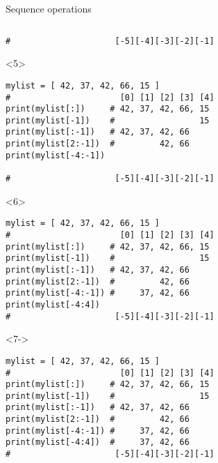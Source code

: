 \begin{frame}[fragile]{Sequence operations}
\begin{center}
\begin{columns}[onlytextwidth]
\begin{column}{\textwidth}
\begin{onlyenv}
\begin{lstlisting}[style=python,morekeywords={for, in, range, list}]
#                     [-5][-4][-3][-2][-1] \end{lstlisting}
      \end{onlyenv}

      \begin{onlyenv}<5>
        \begin{lstlisting}[style=python,morekeywords={for, in, range, list}]
mylist = [ 42, 37, 42, 66, 15 ]
#                      [0] [1] [2] [3] [4]
print(mylist[:])     # 42, 37, 42, 66, 15
print(mylist[-1])    #                 15
print(mylist[:-1])   # 42, 37, 42, 66
print(mylist[2:-1])  #         42, 66
print(mylist[-4:-1])

#                     [-5][-4][-3][-2][-1] \end{lstlisting}
      \end{onlyenv}

      \begin{onlyenv}<6>
        \begin{lstlisting}[style=python,morekeywords={for, in, range, list}]
mylist = [ 42, 37, 42, 66, 15 ]
#                      [0] [1] [2] [3] [4]
print(mylist[:])     # 42, 37, 42, 66, 15
print(mylist[-1])    #                 15
print(mylist[:-1])   # 42, 37, 42, 66
print(mylist[2:-1])  #         42, 66
print(mylist[-4:-1]) #     37, 42, 66
print(mylist[-4:4])
#                     [-5][-4][-3][-2][-1] \end{lstlisting}
      \end{onlyenv}

      \begin{onlyenv}<7->
        \begin{lstlisting}[style=python,morekeywords={for, in, range, list}]
mylist = [ 42, 37, 42, 66, 15 ]
#                      [0] [1] [2] [3] [4]
print(mylist[:])     # 42, 37, 42, 66, 15
print(mylist[-1])    #                 15
print(mylist[:-1])   # 42, 37, 42, 66
print(mylist[2:-1])  #         42, 66
print(mylist[-4:-1]) #     37, 42, 66
print(mylist[-4:4])  #     37, 42, 66
#                     [-5][-4][-3][-2][-1] \end{lstlisting}
      \end{onlyenv}

    \end{column}
  \end{columns}

  \end{center}

\end{frame}


